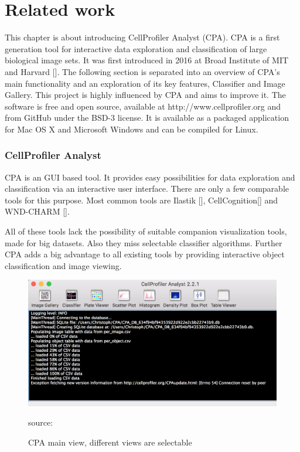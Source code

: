 \chapter{Related work}
This chapter is about introducing CellProfiler Analyst (CPA). CPA is a first generation tool for interactive data exploration and classification of large biological image sets. 
It was first introduced in 2016 at Broad Institute of MIT and Harvard []. The following section is separated into an overview of CPA's main functionality and an exploration of its key features, Classifier and Image Gallery. This project is highly influenced by CPA and aims to improve it. The software is free and open source, available at http://www.cellprofiler.org and from GitHub under the BSD-3 license. It is available as a packaged application for
Mac OS X and Microsoft Windows and can be compiled for Linux.

\subsection{CellProfiler Analyst}
CPA is an GUI based tool. It provides easy possibilities for data exploration and classification via an interactive user interface. There are only a few comparable tools for this purpose. Most common tools are Ilastik [], CellCognition[] and WND-CHARM [].

All of these tools lack the possibility of suitable companion visualization tools, made for big datasets. Also they miss selectable classifier algorithms. Further CPA adds a big advantage to all existing tools by providing interactive object classification and image viewing.

\begin{figure}[H]
	\centering
	\includegraphics[width=0.8\linewidth]{bilder/related_work/cpa_main_view.png}
	\caption{CPA main view, different views are selectable} source: \cite{Jones2008}
	\label{fig:CPA}
\end{figure}

